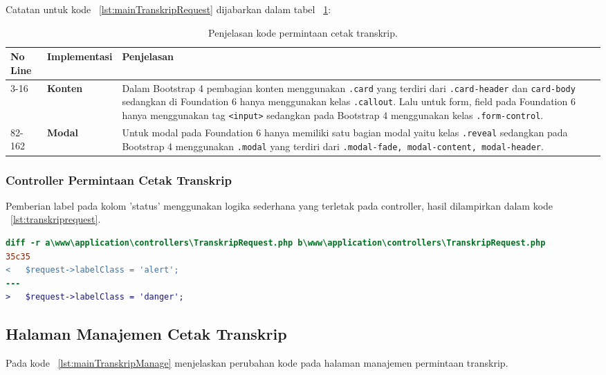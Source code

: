 \noindent Catatan untuk kode ~\ref{lst:mainTranskripRequest} dijabarkan dalam tabel ~\ref{table:kodePermintaanCetakTranskrip}:
\begin{table}[H]
	\centering
	\caption{Penjelasan kode permintaan cetak transkrip.}
	\begin{tabularx}{\textwidth}{llX}
		\toprule
		No Line & Implementasi     & Penjelasan\\
		\midrule
		3-16 & \textbf{Konten} & Dalam Bootstrap 4 pembagian konten menggunakan \texttt{.card} yang terdiri dari \texttt{.card-header} dan \texttt{card-body} sedangkan di Foundation 6 hanya menggunakan kelas \texttt{.callout}. Lalu untuk form, field pada Foundation 6 hanya menggunakan tag \texttt{<input>} sedangkan pada Bootstrap 4 menggunakan kelas \texttt{.form-control}.\\
		82-162 & \textbf{Modal} & Untuk modal pada Foundation 6 hanya memiliki satu bagian modal yaitu kelas \texttt{.reveal} sedangkan pada Bootstrap 4 menggunakan \texttt{.modal} yang terdiri dari \texttt{.modal-fade, modal-content, modal-header}.\\
		\bottomrule
	\end{tabularx}%
	\label{table:kodePermintaanCetakTranskrip}
\end{table}

\subsubsection{Controller Permintaan Cetak Transkrip}
Pemberian label pada kolom 'status' menggunakan logika sederhana yang terletak pada controller, hasil dilampirkan dalam kode ~\ref{lst:transkriprequest}.
\begin{lstlisting}[language=diff, caption=Perubahan file \www\application\controllers\TranskripRequest.php,  basicstyle=\ttfamily, frame=single,
columns=fullflexible, keepspaces=true, breaklines=true, label={lst:transkriprequest}]
diff -r a\www\application\controllers\TranskripRequest.php b\www\application\controllers\TranskripRequest.php
35c35
<   $request->labelClass = 'alert';
---
>   $request->labelClass = 'danger';
\end{lstlisting}

\subsection{Halaman Manajemen Cetak Transkrip} 
Pada kode ~\ref{lst:mainTranskripManage} menjelaskan perubahan kode pada halaman manajemen permintaan transkrip.

